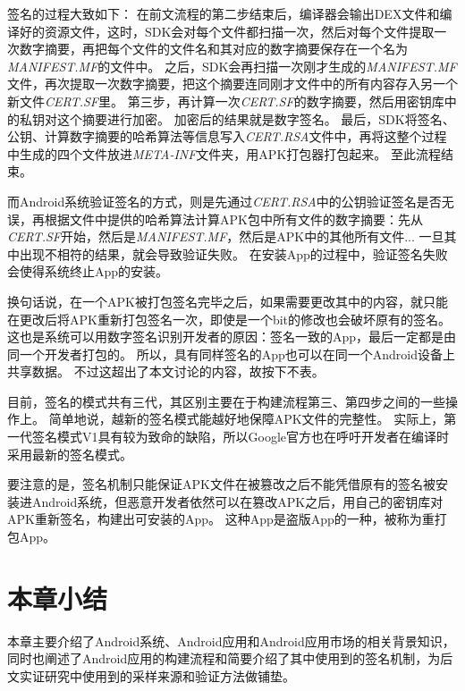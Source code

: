 签名的过程大致如下：
在前文流程的第二步结束后，编译器会输出DEX文件和编译好的资源文件，这时，SDK会对每个文件都扫描一次，然后对每个文件提取一次数字摘要，再把每个文件的文件名和其对应的数字摘要保存在一个名为\textit{MANIFEST.MF}的文件中。
之后，SDK会再扫描一次刚才生成的\textit{MANIFEST.MF}文件，再次提取一次数字摘要，把这个摘要连同刚才文件中的所有内容存入另一个新文件\textit{CERT.SF}里。
第三步，再计算一次\textit{CERT.SF}的数字摘要，然后用密钥库中的私钥对这个摘要进行加密。
加密后的结果就是数字签名。
最后，SDK将签名、公钥、计算数字摘要的哈希算法等信息写入\textit{CERT.RSA}文件中，再将这整个过程中生成的四个文件放进\textit{META-INF}文件夹，用APK打包器打包起来。
至此流程结束。

而Android系统验证签名的方式，则是先通过\textit{CERT.RSA}中的公钥验证签名是否无误，再根据文件中提供的哈希算法计算APK包中所有文件的数字摘要：先从\textit{CERT.SF}开始，然后是\textit{MANIFEST.MF}，然后是APK中的其他所有文件...
一旦其中出现不相符的结果，就会导致验证失败。
在安装App的过程中，验证签名失败会使得系统终止App的安装。

换句话说，在一个APK被打包签名完毕之后，如果需要更改其中的内容，就只能在更改后将APK重新打包签名一次，即使是一个bit的修改也会破坏原有的签名。
这也是系统可以用数字签名识别开发者的原因：签名一致的App，最后一定都是由同一个开发者打包的。
所以，具有同样签名的App也可以在同一个Android设备上共享数据。
不过这超出了本文讨论的内容，故按下不表。

目前，签名的模式共有三代，其区别主要在于构建流程第三、第四步之间的一些操作上。
简单地说，越新的签名模式能越好地保障APK文件的完整性。
实际上，第一代签名模式V1具有较为致命的缺陷，所以Google官方也在呼吁开发者在编译时采用最新的签名模式。

要注意的是，签名机制只能保证APK文件在被篡改之后不能凭借原有的签名被安装进Android系统，但恶意开发者依然可以在篡改APK之后，用自己的密钥库对APK重新签名，构建出可安装的App。
这种App是盗版App的一种，被称为重打包App。

\section{本章小结}

本章主要介绍了Android系统、Android应用和Android应用市场的相关背景知识，同时也阐述了Android应用的构建流程和简要介绍了其中使用到的签名机制，为后文实证研究中使用到的采样来源和验证方法做铺垫。
